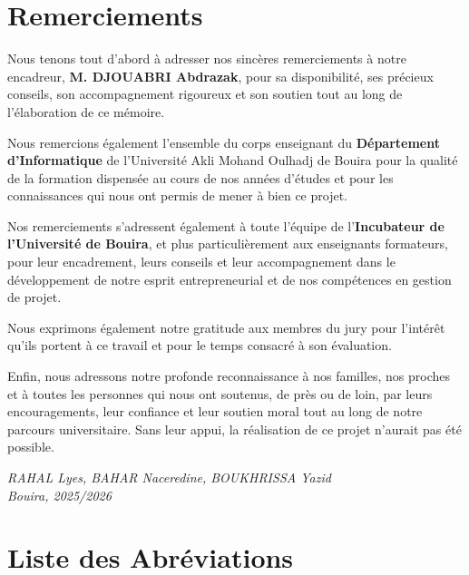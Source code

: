\documentclass[12pt,a4paper]{report}
\begin{document}
\newpage

\cleardoublepage
\thispagestyle{empty}
\chapter*{Remerciements}

Nous tenons tout d'abord à adresser nos sincères remerciements à notre
encadreur, \textbf{M. DJOUABRI Abdrazak}, pour sa disponibilité, ses précieux
conseils, son accompagnement rigoureux et son soutien tout au long de
l'élaboration de ce mémoire.

Nous remercions également l'ensemble du corps enseignant du \textbf{Département
  d'Informatique} de l'Université Akli Mohand Oulhadj de Bouira pour la qualité
de la formation dispensée au cours de nos années d'études et pour les
connaissances qui nous ont permis de mener à bien ce projet.

Nos remerciements s'adressent également à toute l'équipe de
l'\textbf{Incubateur de l'Université de Bouira}, et plus particulièrement aux
enseignants formateurs, pour leur encadrement, leurs conseils et leur
accompagnement dans le développement de notre esprit entrepreneurial et de nos
compétences en gestion de projet.

Nous exprimons également notre gratitude aux membres du jury pour l'intérêt
qu'ils portent à ce travail et pour le temps consacré à son évaluation.

Enfin, nous adressons notre profonde reconnaissance à nos familles, nos proches
et à toutes les personnes qui nous ont soutenus, de près ou de loin, par leurs
encouragements, leur confiance et leur soutien moral tout au long de notre
parcours universitaire. Sans leur appui, la réalisation de ce projet n'aurait
pas été possible.

\vspace{1cm}
\begin{flushright}
  \textit{RAHAL Lyes, BAHAR Naceredine, BOUKHRISSA Yazid}\\
  \textit{Bouira, 2025/2026}
\end{flushright}
\newpage

\cleardoublepage
\chapter*{Liste des Abréviations}
\end{document}
